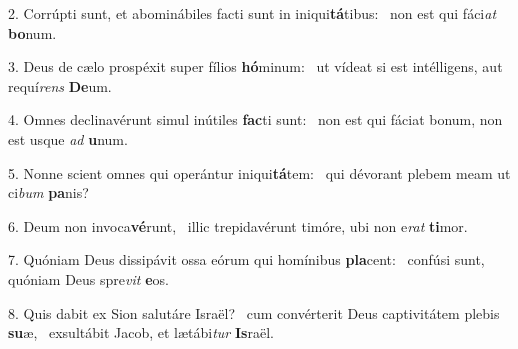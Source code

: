2. Corrúpti sunt, et abominábiles facti sunt in iniqui\textbf{tá}tibus: \ast\  non est qui fáci\textit{at} \textbf{bo}num.\

3. Deus de cælo prospéxit super fílios \textbf{hó}minum: \ast\  ut vídeat si est intélligens, aut requí\textit{rens} \textbf{De}um.\

4. Omnes declinavérunt simul inútiles \textbf{fac}ti sunt: \ast\  non est qui fáciat bonum, non est usque \textit{ad} \textbf{u}num.\

5. Nonne scient omnes qui operántur iniqui\textbf{tá}tem: \ast\  qui dévorant plebem meam ut ci\textit{bum} \textbf{pa}nis?\

6. Deum non invoca\textbf{vé}runt, \ast\  illic trepidavérunt timóre, ubi non e\textit{rat} \textbf{ti}mor.\

7. Quóniam Deus dissipávit ossa eórum qui homínibus \textbf{pla}cent: \ast\  confúsi sunt, quóniam Deus spre\textit{vit} \textbf{e}os.\

8. Quis dabit ex Sion salutáre Israël? \dag\  cum convérterit Deus captivitátem plebis \textbf{su}æ, \ast\  exsultábit Jacob, et lætábi\textit{tur} \textbf{Is}raël.\

